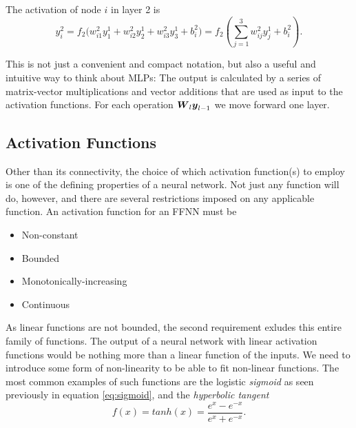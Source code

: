The activation of node $i$ in layer 2 is
\begin{equation}
 y^2_i = f_2\Bigr(w^2_{i1}y^1_1 + w^2_{i2}y^1_2 + w^2_{i3}y^1_3 + b^2_i\Bigr) = 
 f_2\left(\sum_{j=1}^3 w^2_{ij} y_j^1 + b^2_i\right).
\end{equation}

This is not just a convenient and compact notation, but also a useful
and intuitive way to think about MLPs: The output is calculated by a
series of matrix-vector multiplications and vector additions that are
used as input to the activation functions. For each operation
${\boldsymbol{W}}_l {\boldsymbol{y}}_{l-1}$ we move forward one layer.

\subsection{Activation Functions}
Other than its connectivity, the choice of which activation function(s) to employ 
is one of the defining properties of a neural network. Not just any function will do,
however, and there are several restrictions imposed on any applicable function.
An activation function for an FFNN must be
\begin{itemize}
	\item Non-constant
	\item Bounded
	\item Monotonically-increasing
	\item Continuous
\end{itemize}

\noindent As linear functions are not bounded, the second requirement exludes this entire family of functions.
The output of a neural network with linear activation functions would be nothing more than a linear function
of the inputs. We need to introduce some form of non-linearity to be able to fit non-linear functions.
The most common examples of such functions are the logistic \textit{sigmoid} as seen
previously in equation \ref{eq:sigmoid}, and the \textit{hyperbolic tangent}
\begin{equation}\label{eq:hyp-tangent}
	f(x) = tanh(x) = \frac{e^x - e^{-x}}{e^x + e^{-x}}.
\end{equation}

